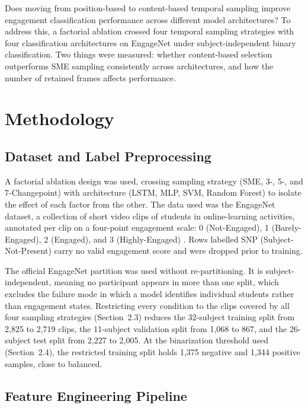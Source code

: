 \documentclass[11pt,a4paper]{article}
\begin{document}
Does moving from position-based to content-based temporal sampling improve engagement classification performance across different model architectures? To address this, a factorial ablation crossed four temporal sampling strategies with four classification architectures on EngageNet under subject-independent binary classification. Two things were measured: whether content-based selection outperforms SME sampling consistently across architectures, and how the number of retained frames affects performance.

\section{Methodology}

\subsection{Dataset and Label Preprocessing}

A factorial ablation design was used, crossing sampling strategy (SME, 3-, 5-, and 7-Changepoint) with architecture (LSTM, MLP, SVM, Random Forest) to isolate the effect of each factor from the other. The data used was the EngageNet dataset, a collection of short video clips of students in online-learning activities, annotated per clip on a four-point engagement scale: 0 (Not-Engaged), 1 (Barely-Engaged), 2 (Engaged), and 3 (Highly-Engaged) \citep{singh2023}. Rows labelled SNP (Subject-Not-Present) carry no valid engagement score and were dropped prior to training.

The official EngageNet partition was used without re-partitioning. It is subject-independent, meaning no participant appears in more than one split, which excludes the failure mode in which a model identifies individual students rather than engagement states. Restricting every condition to the clips covered by all four sampling strategies (Section~2.3) reduces the 32-subject training split from 2,825 to 2,719 clips, the 11-subject validation split from 1,068 to 867, and the 26-subject test split from 2,227 to 2,005. At the binarization threshold used (Section~2.4), the restricted training split holds 1,375 negative and 1,344 positive samples, close to balanced.

\subsection{Feature Engineering Pipeline}
\end{document}
